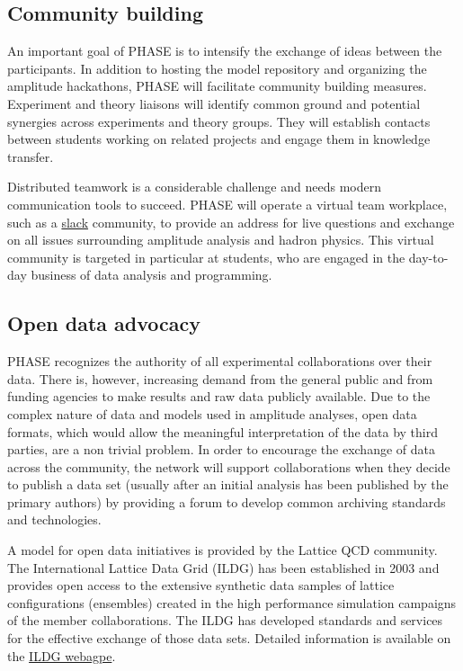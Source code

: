 \subsection{Community building}
\label{sec:community}
An important goal of PHASE is to intensify the exchange of ideas between the participants. In addition to hosting the model repository and organizing the amplitude hackathons, PHASE will facilitate community building measures. Experiment and theory liaisons will identify common ground and potential synergies across experiments and theory groups. They will establish contacts between students working on related projects and engage them in knowledge transfer.

Distributed teamwork is a considerable challenge and needs modern communication tools to succeed. PHASE will operate a virtual team workplace, such as a \href{http://slack.com}{slack} community, to provide an address for live questions and exchange on all issues surrounding amplitude analysis and hadron physics. This virtual community is targeted in particular at students, who are engaged in the day-to-day business of data analysis and programming.

\subsection{Open data advocacy}
\label{sec:opendata}
PHASE recognizes the authority of all experimental collaborations over their data. There is, however, increasing demand from the general public and from funding agencies to make results and raw data publicly available. Due to the complex nature of data and models used in amplitude analyses, open data formats, which would allow the meaningful interpretation of the data by third parties, are a non trivial problem. In order to encourage the exchange of data across the community, the network will support collaborations when they decide to publish a data set (usually after an initial analysis has been published by the primary authors) by providing a forum to develop common archiving standards and technologies.

A model for open data initiatives is provided by the Lattice QCD community. The International Lattice Data Grid (ILDG) has been established in 2003 \cite{Davies_2003} and provides open access to the extensive synthetic data samples of lattice configurations (ensembles) created in the high performance simulation campaigns of the member collaborations. The ILDG has developed standards and services for the effective exchange of those data sets. Detailed information is available on the \href{http://plone.jldg.org/wiki/index.php/Main_Page}{ILDG webagpe}.

